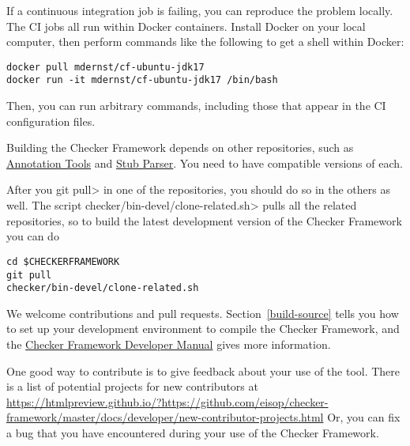 
If a continuous integration job is failing, you can reproduce the problem locally.
The CI jobs all run within Docker containers.
Install Docker on your local computer, then perform commands like the
following to get a shell within Docker:

\begin{Verbatim}
docker pull mdernst/cf-ubuntu-jdk17
docker run -it mdernst/cf-ubuntu-jdk17 /bin/bash
\end{Verbatim}

Then, you can run arbitrary commands, including those that appear in the
CI configuration files.



Building the Checker Framework depends on other repositories, such as
\href{https://github.com/eisop/annotation-tools/}{Annotation Tools} and
\href{https://github.com/eisop/stubparser/}{Stub Parser}.
You need to have compatible versions of each.

After you \<git pull> in one of the repositories, you should do so in the
others as well.  The script \<checker/bin-devel/clone-related.sh> pulls all the
related repositories, so to build the latest development version of the
Checker Framework you can do

\begin{Verbatim}
cd $CHECKERFRAMEWORK
git pull
checker/bin-devel/clone-related.sh
\end{Verbatim}



We welcome contributions and pull requests.  Section~\ref{build-source}
tells you how to set up your development environment to compile the Checker
Framework, and the
\href{https://htmlpreview.github.io/?https://github.com/eisop/checker-framework/master/docs/developer/developer-manual.html}{Checker
  Framework Developer Manual} gives more information.

One good way to contribute is to give feedback about your use of the tool.
There is a list
of potential projects for new contributors at
\url{https://htmlpreview.github.io/?https://github.com/eisop/checker-framework/master/docs/developer/new-contributor-projects.html}
Or, you can fix a bug that
you have encountered during your use of the Checker Framework.


